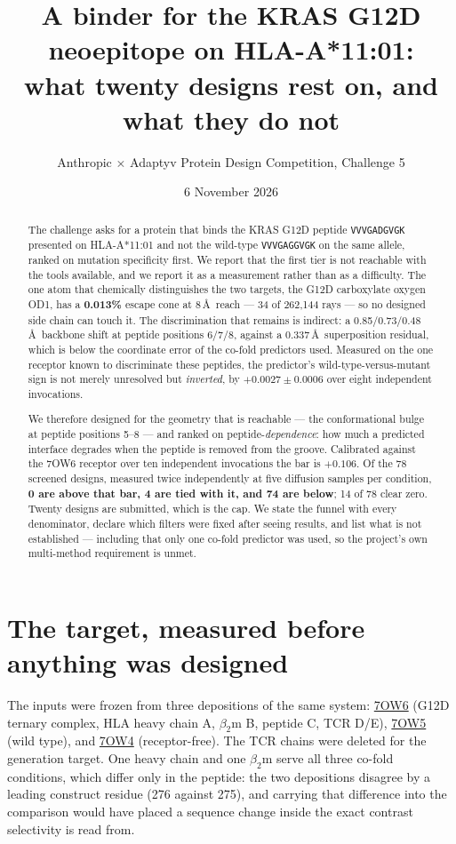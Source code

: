 \documentclass[11pt,a4paper]{article}
\title{A binder for the KRAS G12D neoepitope on HLA-A*11:01:\\
what twenty designs rest on, and what they do not}
\author{Anthropic $\times$ Adaptyv Protein Design Competition, Challenge 5}
\date{6 November 2026}
\begin{document}
\maketitle

\begin{abstract}
\noindent
The challenge asks for a protein that binds the KRAS G12D peptide \texttt{VVVGADGVGK}
presented on HLA-A*11:01 and not the wild-type \texttt{VVVGAGGVGK} on the same allele, ranked
on mutation specificity first. We report that the first tier is not reachable with the tools
available, and we report it as a measurement rather than as a difficulty. The one atom that
chemically distinguishes the two targets, the G12D carboxylate oxygen OD1, has a
\textbf{0.013\%} escape cone at 8\,\AA\ reach --- 34 of 262{,}144 rays --- so no designed
side chain can touch it. The discrimination that remains is indirect: a 0.85/0.73/0.48\,\AA\
backbone shift at peptide positions 6/7/8, against a 0.337\,\AA\ superposition residual, which
is below the coordinate error of the co-fold predictors used. Measured on the one receptor known
to discriminate these peptides, the predictor's wild-type-versus-mutant sign is not merely
unresolved but \emph{inverted}, by $+0.0027 \pm 0.0006$ over eight independent invocations.

We therefore designed for the geometry that is reachable --- the conformational bulge at peptide
positions 5--8 --- and ranked on peptide-\emph{dependence}: how much a predicted interface
degrades when the peptide is removed from the groove. Calibrated against the 7OW6 receptor over
ten independent invocations the bar is $+0.106$. Of the 78 screened designs, measured twice
independently at five diffusion samples per condition, \textbf{0 are above that bar, 4 are tied
with it, and 74 are below}; 14 of 78 clear zero. Twenty designs are submitted, which is the cap.
We state the funnel with every denominator, declare which filters were fixed after seeing
results, and list what is not established --- including that only one co-fold predictor was
used, so the project's own multi-method requirement is unmet.
\end{abstract}

\section{The target, measured before anything was designed}

The inputs were frozen from three depositions of the same system: \href{https://www.rcsb.org/structure/7OW6}{7OW6}
(G12D ternary complex, HLA heavy chain A, $\beta_2$m B, peptide C, TCR D/E),
\href{https://www.rcsb.org/structure/7OW5}{7OW5} (wild type), and
\href{https://www.rcsb.org/structure/7OW4}{7OW4} (receptor-free). The TCR chains were deleted for
the generation target. One heavy chain and one $\beta_2$m serve all three co-fold conditions,
which differ only in the peptide: the two depositions disagree by a leading construct residue
(276 against 275), and carrying that difference into the comparison would have placed a sequence
change inside the exact contrast selectivity is read from.
\end{document}

